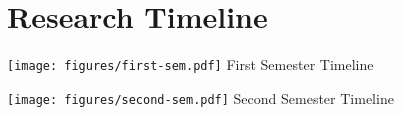 \chapter{Research Timeline}

\begin{center}
    \texttt{[image: figures/first-sem.pdf]}
    First Semester Timeline
\end{center}

\begin{center}
    \texttt{[image: figures/second-sem.pdf]}
    Second Semester Timeline
\end{center}
